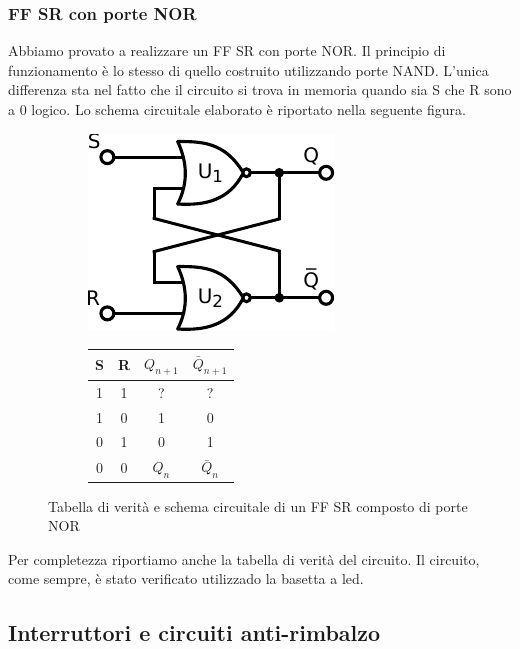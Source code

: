 \subsubsection*{FF SR con porte NOR}

Abbiamo provato a realizzare un FF SR con porte NOR.
Il principio di funzionamento è lo stesso di quello costruito utilizzando porte NAND.
L'unica differenza sta nel fatto che il circuito si trova in memoria quando sia S che R sono a 0 logico.
Lo schema circuitale elaborato è riportato nella seguente figura.

\begin{figure}[htpc]
\centering
        \begin{subfigure}[hc]{.5\textwidth}
		\centering
		\includegraphics[width=.35\textwidth]{../E11/latex/FF-w-NOR.pdf}
		\caption{}
		\label{cir11:nor}
        \end{subfigure}
	\begin{subfigure}[hc]{.4\textwidth}
		\centering
		{\renewcommand{\arraystretch}{1.1}%
		\begin{tabular}{|c|c|c|c|}
		\hline
		S & R & $Q_{n+1}$ & $\bar Q_{n+1}$  \\
		\hline
		1 & 1  & ?&?\\
		\hline
		1&0 & 1 & 0\\
		\hline
		0&1 & 0  &1\\
		\hline
		0&0 & $Q_n$ & $\bar Q_n$\\
		\hline
		\end{tabular}}
		\caption{}
		\label{tab11:nor}
        \end{subfigure}
\caption{Tabella di verità e schema circuitale di un FF SR composto di porte NOR}
\end{figure}

Per completezza riportiamo anche la tabella di verità del circuito.
Il circuito, come sempre, è stato verificato utilizzado la basetta a led.

\subsection{Interruttori e circuiti anti-rimbalzo}


